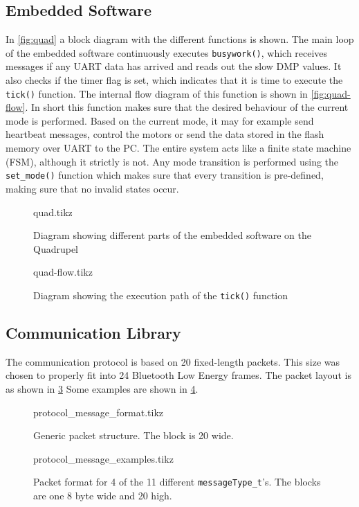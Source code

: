 \documentclass[final]{article}
\begin{document}
\subsection{Embedded Software}
In \autoref{fig:quad} a block diagram with the different functions is shown.
The main loop of the embedded software continuously executes \texttt{busywork()}, which receives messages if any UART data has arrived and reads out the slow DMP values.
It also checks if the timer flag is set, which indicates that it is time to execute the \texttt{tick()} function.
The internal flow diagram of this function is shown in \autoref{fig:quad-flow}.
In short this function makes sure that the desired behaviour of the current mode is performed.
Based on the current mode, it may for example send heartbeat messages, control the motors or send the data stored in the flash memory over UART to the PC.
The entire system acts like a finite state machine (FSM), although it strictly is not.
Any mode transition is performed using the \texttt{set\_mode()} function which makes sure that every transition is pre-defined, making sure that no invalid states occur.

\begin{figure}[H]
\centering
    {quad.tikz}
    \caption{Diagram showing different parts of the embedded software on the Quadrupel}
    \label{fig:quad}
\end{figure}

\begin{figure}[H]
\centering
    {quad-flow.tikz}
    \caption{Diagram showing the execution path of the \texttt{tick()} function}
    \label{fig:quad-flow}
\end{figure}

\newpage
\subsection{Communication Library}
The communication protocol is based on \SI{20}{\byte} fixed-length packets.
This size was chosen to properly fit into \SI{24}{\byte} Bluetooth Low Energy frames.
The packet layout is as shown in \cref{fig:packet-format}
Some examples are shown in \cref{fig:packet-examples}.
\begin{figure}[H]
\centering
    {protocol_message_format.tikz}
    \caption{Generic packet structure. The block is \SI{20}{\byte} wide.}
    \label{fig:packet-format}
\end{figure}
\begin{figure}[H]
\centering
    {protocol_message_examples.tikz}
    \caption{Packet format for 4 of the 11 different \texttt{messageType\_t}'s. The blocks are one \SI{8}{\bit} byte wide and \SI{20}{\byte} high.}
    \label{fig:packet-examples}
\end{figure}
\end{document}
